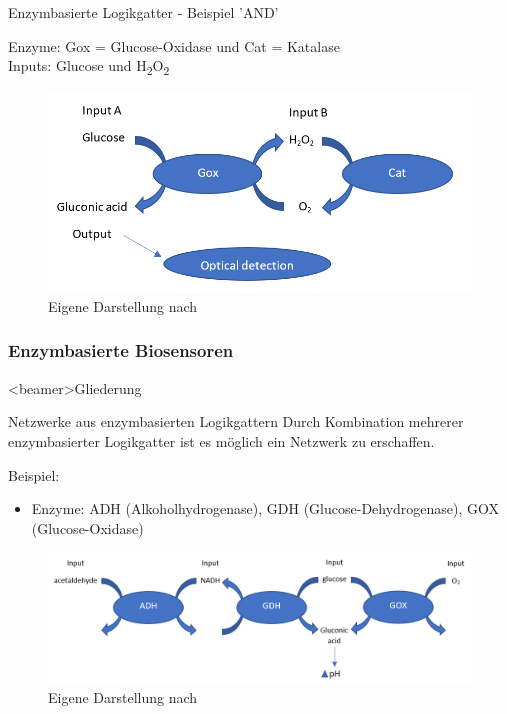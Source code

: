 \documentclass{beamer}
\begin{document}
    \begin{frame}{Enzymbasierte Logikgatter - Beispiel 'AND'}
    
    Enzyme: Gox = Glucose-Oxidase und Cat = Katalase\\
    Inputs: Glucose und H\textsubscript{2}O\textsubscript{2}
    
     \begin{figure}[H] \centering \includegraphics[scale= 0.33]{pics/ANDneu.png} \caption{Eigene Darstellung nach \cite{hallo4} } \label{img:and} 	
   	 \end{figure}
  
    \end{frame}


    \subsubsection{Enzymbasierte Biosensoren}
    
    \begin{frame}<beamer>{Gliederung}
	\end{frame}
    
    \begin{frame}{Netzwerke aus enzymbasierten Logikgattern}
    	Durch Kombination mehrerer enzymbasierter Logikgatter ist es m{\"o}glich ein Netzwerk zu erschaffen.
    	
    	Beispiel: 
    	\begin{itemize}
    		\item Enzyme: ADH (Alkoholhydrogenase), GDH (Glucose-Dehydrogenase), GOX (Glucose-Oxidase)
    	\end{itemize}
    	\begin{figure}
    		\centering \scriptsize \includegraphics[scale= 0.30]{pics/network1.png}
    	\caption{Eigene Darstellung nach \cite{hallo4}} 
   		\end{figure}
   		
   	
    
	\end{frame}
\end{document}
